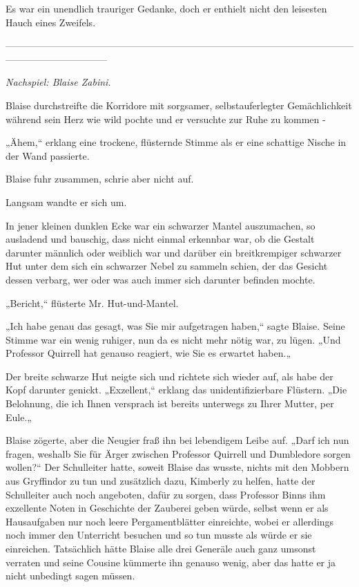 {Es war ein unendlich trauriger Gedanke, doch er enthielt nicht den leisesten Hauch eines Zweifels.

--------------------------------------------------------------------------------------------------------------------------------------------

\hfill\break \emph{Nachspiel: Blaise Zabini.}

Blaise durchstreifte die Korridore mit sorgsamer, selbstauferlegter Gemächlichkeit während sein Herz wie wild pochte und er versuchte zur Ruhe zu kommen -

„Ähem,“ erklang eine trockene, flüsternde Stimme als er eine schattige Nische in der Wand passierte.

Blaise fuhr zusammen, schrie aber nicht auf.

Langsam wandte er sich um.

In jener kleinen dunklen Ecke war ein schwarzer Mantel auszumachen, so ausladend und bauschig, dass nicht einmal erkennbar war, ob die Gestalt darunter männlich oder weiblich war und darüber ein breitkrempiger schwarzer Hut unter dem sich ein schwarzer Nebel zu sammeln schien, der das Gesicht dessen verbarg, wer oder was auch immer sich darunter befinden mochte.

„Bericht,“ flüsterte Mr. Hut-und-Mantel.

„Ich habe genau das gesagt, was Sie mir aufgetragen haben,“ sagte Blaise. Seine Stimme war ein wenig ruhiger, nun da es nicht mehr nötig war, zu lügen. „Und Professor Quirrell hat genauso reagiert, wie Sie es erwartet haben.„

Der breite schwarze Hut neigte sich und richtete sich wieder auf, als habe der Kopf darunter genickt. „Exzellent,“ erklang das unidentifizierbare Flüstern. „Die Belohnung, die ich Ihnen versprach ist bereits unterwegs zu Ihrer Mutter, per Eule.„

Blaise zögerte, aber die Neugier fraß ihn bei lebendigem Leibe auf. „Darf ich nun fragen, weshalb Sie für Ärger zwischen Professor Quirrell und Dumbledore sorgen wollen?“ Der Schulleiter hatte, soweit Blaise das wusste, nichts mit den Mobbern aus Gryffindor zu tun und zusätzlich dazu, Kimberly zu helfen, hatte der Schulleiter auch noch angeboten, dafür zu sorgen, dass Professor Binns ihm exzellente Noten in Geschichte der Zauberei geben würde, selbst wenn er als Hausaufgaben nur noch leere Pergamentblätter einreichte, wobei er allerdings noch immer den Unterricht besuchen und so tun musste als würde er sie einreichen. Tatsächlich hätte Blaise alle drei Generäle auch ganz umsonst verraten und seine Cousine kümmerte ihn genauso wenig, aber das hatte er ja nicht unbedingt sagen müssen.

}
